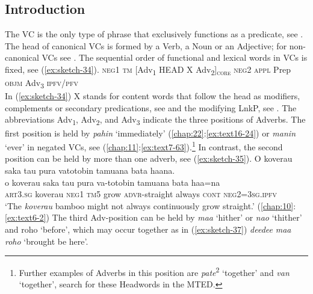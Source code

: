 \documentclass[output=paper]{langscibook}
\begin{document}
\subsection{Introduction}\label{sec:verbcomplintro}
The VC is the only type of phrase that exclusively functions as a predicate, see . The head of canonical VCs is formed by a Verb, a Noun or an Adjective; for non-canonical VCs see . The sequential order of functional and lexical words in VCs is fixed, see (\ref{ex:sketch-34}).
\ea\label{ex:sketch-34}
    \textup{\textsc{neg}1 \textsc{tm}	[Adv\textsubscript{1} HEAD X Adv\textsubscript{2}]\textsubscript{\textsc{core}} 	\textsc{neg2} \textsc{appl} Prep \textsc{objm} Adv\textsubscript{3} \textsc{ipfv}/\textsc{pfv}}\\
\z
In (\ref{ex:sketch-34}) X stands for content words that follow the head as modifiers, complements or secondary predications, see  and the modifying LnkP, see . The abbreviations Adv\textsubscript{1}, Adv\textsubscript{2}, and Adv\textsubscript{3} indicate the three positions of Adverbs. The first position is held by \textit{pahin} `immediately' (\ref{chap:22}:\ref{ex:text16-24}) or \textit{manin} `ever' in negated VCs, see (\ref{chap:11}:\ref{ex:text7-63}).\footnote{Further examples of Adverbs in this position are \textit{pate}\textsuperscript{2} `together' and \textit{van} `together', search for these Headwords in the MTED.}
In contrast, the second position can be held by more than one adverb, see (\ref{ex:sketch-35}).
\ea\label{ex:sketch-35}
O koverau saka tau pura vatotobin tamuana bata haana.\\
\gll o	koverau	saka	tau	pura	va-totobin	tamuana	bata	haa=na\\
     \textsc{art}3.\textsc{sg}	koverau	\textsc{neg}1	\textsc{tm}5	grow	\textsc{advr}-straight	always	\textsc{cont}	\textsc{neg}2=3\textsc{sg}.\textsc{ipfv}\\
\glt `The \textit{koverau} bamboo might not always continuously grow straight.' (\ref{chap:10}:\ref{ex:text6-2})
\z
The third Adv-position can be held by \textit{maa} `hither' or \textit{nao} `thither' and roho `before', which may occur together as in (\ref{ex:sketch-37}) \textit{deedee} \textit{maa} \textit{roho} `brought be here'.
\end{document}
